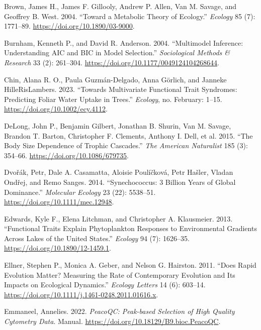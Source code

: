 \documentclass[
  letterpaper,
  DIV=11,
  numbers=noendperiod]{scrartcl}
\newlength{\cslentryspacing}
\begin{document}
\label{refs}
\setlength{\cslentryspacing}{0em}
\begin{CSLReferences}
Brown, James H., James F. Gillooly, Andrew P. Allen, Van M. Savage, and
Geoffrey B. West. 2004. {``Toward a {Metabolic Theory} of {Ecology}.''}
\emph{Ecology} 85 (7): 1771--89. \url{https://doi.org/10.1890/03-9000}.

Burnham, Kenneth P., and David R. Anderson. 2004. {``Multimodel
{Inference}: {Understanding AIC} and {BIC} in {Model Selection}.''}
\emph{Sociological Methods \& Research} 33 (2): 261--304.
\url{https://doi.org/10.1177/0049124104268644}.

Chin, Alana R. O., Paula Guzmán-Delgado, Anna Görlich, and Janneke
HilleRisLambers. 2023. {``Towards Multivariate Functional Trait
Syndromes: {Predicting} Foliar Water Uptake in Trees.''} \emph{Ecology},
no. February: 1--15. \url{https://doi.org/10.1002/ecy.4112}.

DeLong, John P., Benjamin Gilbert, Jonathan B. Shurin, Van M. Savage,
Brandon T. Barton, Christopher F. Clements, Anthony I. Dell, et al.
2015. {``The {Body Size Dependence} of {Trophic Cascades}.''} \emph{The
American Naturalist} 185 (3): 354--66.
\url{https://doi.org/10.1086/679735}.

Dvořák, Petr, Dale A. Casamatta, Aloisie Poulíčková, Petr Hašler, Vladan
Ondřej, and Remo Sanges. 2014. {``Synechococcus: 3 Billion Years of
Global Dominance.''} \emph{Molecular Ecology} 23 (22): 5538--51.
\url{https://doi.org/10.1111/mec.12948}.

Edwards, Kyle F., Elena Litchman, and Christopher A. Klausmeier. 2013.
{``Functional Traits Explain Phytoplankton Responses to Environmental
Gradients Across Lakes of the {United States}.''} \emph{Ecology} 94 (7):
1626--35. \url{https://doi.org/10.1890/12-1459.1}.

Ellner, Stephen P., Monica A. Geber, and Nelson G. Hairston. 2011.
{``Does Rapid Evolution Matter? {Measuring} the Rate of Contemporary
Evolution and Its Impacts on Ecological Dynamics.''} \emph{Ecology
Letters} 14 (6): 603--14.
\url{https://doi.org/10.1111/j.1461-0248.2011.01616.x}.

Emmaneel, Annelies. 2022. \emph{{PeacoQC}: {Peak-based} Selection of
High Quality Cytometry Data}. Manual.
\url{https://doi.org/10.18129/B9.bioc.PeacoQC}.


\end{CSLReferences}
\end{document}
